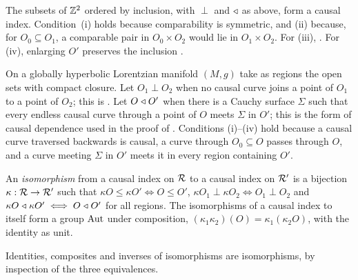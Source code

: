 \begin{extra}
\begin{example}\label{ex:lattice-index}
The subsets of $\mathbb Z^2$ ordered by inclusion, with $\perp$ and $\mathrel{\triangleleft}$ as above, form a causal
index. Condition~(i) holds because comparability is symmetric, and (ii) because, for
$O_0\subseteq O_1$, a comparable pair in $O_0\times O_2$ would lie in $O_1\times O_2$. For (iii), . For (iv), enlarging $O'$
preserves the inclusion .
\end{example}
\end{extra}

\begin{example}\label{ex:gh-index}
On a globally hyperbolic Lorentzian manifold $(M,g)$ take as regions the open sets with
compact closure. Let $O_1\perp O_2$ when no causal curve joins a point of $O_1$ to a point of
$O_2$; this is . Let $O\mathrel{\triangleleft} O'$ when there is a  Cauchy surface
$\Sigma$ such that every endless causal curve through a point of $O$ meets $\Sigma$ in $O'$;
this is the form of causal dependence used in the proof of .
Conditions (i)--(iv) hold because a causal curve traversed backwards is causal, a curve
through $O_0\subseteq O$ passes through $O$, and a curve meeting $\Sigma$ in $O'$ meets it in
every region containing $O'$.
\end{example}

\begin{remark}\label{rem:dimock-dep}
\end{remark}

\begin{extra}
\noindent{}
\end{extra}

\begin{definition}\label{def:iso}
An \emph{isomorphism} from a causal index on $\mathcal R$ to a causal index on $\mathcal R'$ is a bijection
$\kappa:\mathcal R\to\mathcal R'$ such that $\kappa O\leq\kappa O'\iff O\leq O'$,
$\kappa O_1\perp\kappa O_2\iff O_1\perp O_2$ and $\kappa O\mathrel{\triangleleft}\kappa O'\iff O\mathrel{\triangleleft} O'$ for all
regions. The isomorphisms of a causal index to itself form a group $\operatorname{Aut}$ under composition,
$(\kappa_1\kappa_2)(O)=\kappa_1(\kappa_2O)$, with the identity as unit.
\end{definition}
Identities, composites and inverses of isomorphisms are isomorphisms, by inspection of the
three equivalences.

